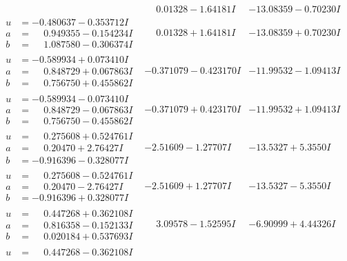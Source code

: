 \documentclass[1p]{elsarticle_modified}
\theoremstyle{definition}
\begin{document}
$$\begin{array}{c|c|c}
 & \phantom{-}0.01328 - 1.64181 I & -13.08359 - 0.70230 I \\ \hline\begin{aligned}
u &= -0.480637 - 0.353712 I \\
a &= \phantom{-}0.949355 - 0.154234 I \\
b &= \phantom{-}1.087580 - 0.306374 I\end{aligned}
 & \phantom{-}0.01328 + 1.64181 I & -13.08359 + 0.70230 I \\ \hline\begin{aligned}
u &= -0.589934 + 0.073410 I \\
a &= \phantom{-}0.848729 + 0.067863 I \\
b &= \phantom{-}0.756750 + 0.455862 I\end{aligned}
 & -0.371079 - 0.423170 I & -11.99532 - 1.09413 I \\ \hline\begin{aligned}
u &= -0.589934 - 0.073410 I \\
a &= \phantom{-}0.848729 - 0.067863 I \\
b &= \phantom{-}0.756750 - 0.455862 I\end{aligned}
 & -0.371079 + 0.423170 I & -11.99532 + 1.09413 I \\ \hline\begin{aligned}
u &= \phantom{-}0.275608 + 0.524761 I \\
a &= \phantom{-}0.20470 + 2.76427 I \\
b &= -0.916396 - 0.328077 I\end{aligned}
 & -2.51609 - 1.27707 I & -13.5327 + 5.3550 I \\ \hline\begin{aligned}
u &= \phantom{-}0.275608 - 0.524761 I \\
a &= \phantom{-}0.20470 - 2.76427 I \\
b &= -0.916396 + 0.328077 I\end{aligned}
 & -2.51609 + 1.27707 I & -13.5327 - 5.3550 I \\ \hline\begin{aligned}
u &= \phantom{-}0.447268 + 0.362108 I \\
a &= \phantom{-}0.816358 - 0.152133 I \\
b &= \phantom{-}0.020184 + 0.537693 I\end{aligned}
 & \phantom{-}3.09578 - 1.52595 I & -6.90999 + 4.44326 I \\ \hline\begin{aligned}
u &= \phantom{-}0.447268 - 0.362108 I \\

\end{aligned}
\end{array}$$
\end{document}

